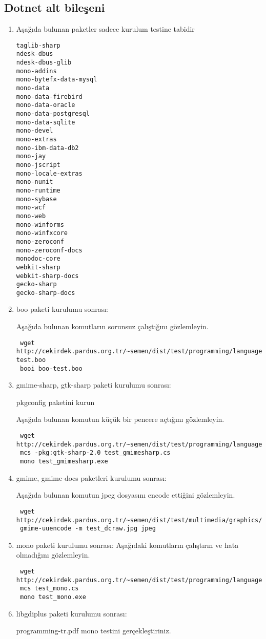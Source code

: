 \documentclass[a4paper,10pt]{article}
\begin{document}
\subsection{Dotnet alt bileşeni}
\begin{enumerate}

\item Aşağıda bulunan paketler sadece kurulum testine tabidir
\begin{verbatim}
taglib-sharp
ndesk-dbus
ndesk-dbus-glib
mono-addins
mono-bytefx-data-mysql
mono-data
mono-data-firebird
mono-data-oracle
mono-data-postgresql
mono-data-sqlite
mono-devel
mono-extras
mono-ibm-data-db2
mono-jay
mono-jscript
mono-locale-extras
mono-nunit
mono-runtime
mono-sybase
mono-wcf
mono-web
mono-winforms
mono-winfxcore
mono-zeroconf
mono-zeroconf-docs
monodoc-core
webkit-sharp
webkit-sharp-docs
gecko-sharp
gecko-sharp-docs
\end{verbatim}

\item boo paketi kurulumu sonrası:

Aşağıda bulunan komutların sorunsuz çalıştığını gözlemleyin.
\begin{verbatim}
 wget http://cekirdek.pardus.org.tr/~semen/dist/test/programming/language/dotnet/boo-test.boo
 booi boo-test.boo
\end{verbatim}
 \item gmime-sharp, gtk-sharp paketi kurulumu sonrası:

pkgconfig paketini kurun

Aşağıda bulunan komutun küçük bir pencere açtığını gözlemleyin. 
\begin{verbatim}
 wget http://cekirdek.pardus.org.tr/~semen/dist/test/programming/language/dotnet/test_gmimesharp.cs
 mcs -pkg:gtk-sharp-2.0 test_gmimesharp.cs
 mono test_gmimesharp.exe
\end{verbatim}


 \item gmime, gmime-docs paketleri kurulumu sonrası:

Aşağıda bulunan komutun jpeg dosyasını encode ettiğini gözlemleyin.
\begin{verbatim}
 wget http://cekirdek.pardus.org.tr/~semen/dist/test/multimedia/graphics/test_dcraw.jpg
 gmime-uuencode -m test_dcraw.jpg jpeg
\end{verbatim}


 \item mono paketi kurulumu sonrası:
Aşağıdaki komutların çalıştırın ve hata olmadığını gözlemleyin.
\begin{verbatim}
 wget http://cekirdek.pardus.org.tr/~semen/dist/test/programming/language/dotnet/test_mono.cs
 mcs test_mono.cs
 mono test_mono.exe
\end{verbatim}

\item libgdiplus paketi kurulumu sonrası:

programming-tr.pdf mono testini gerçekleştiriniz.

\end{enumerate}
\end{document}

